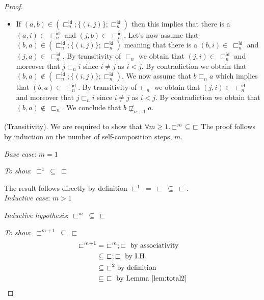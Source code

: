 \begin{thm}
\begin{proof}
{\begin{itemize}
		\item If $(a, b) \in \left( \sqsubset_n^\mathsf{id} ; \{ (i, j) \} ; \sqsubset_n ^\mathsf{id} \right)$ then this implies that there is a $(a, i) \in\ \sqsubset_n^\mathsf{id}$ and $(j, b) \in\ \sqsubset_n^\mathsf{id}$. Let's now assume that $(b, a) \in \left( \sqsubset_n^\mathsf{id} ; \{ (i, j) \} ; \sqsubset_n ^\mathsf{id} \right)$ meaning that there is a $(b, i) \in\ \sqsubset_n^\mathsf{id}$ and $(j, a) \in\ \sqsubset_n^\mathsf{id}$. By transitivity of $\sqsubset_n$ we obtain that $(j, i) \in\ \sqsubset_n^\mathsf{id}$ and moreover that $j \sqsubset_n i$ since $i \neq j$ as $i < j$. By contradiction we obtain that $(b, a) \not\in \left( \sqsubset_n^\mathsf{id} ; \{ (i, j) \} ; \sqsubset_n ^\mathsf{id} \right)$. We now assume that $b \sqsubset_n a$ which implies that $(b, a) \in\ \sqsubset_n^\mathsf{id}$. By transitivity of $\sqsubset_n$ we obtain that $(j, i) \in\ \sqsubset_n^\mathsf{id}$ and moreover that $j \sqsubset_n i$ since $i \neq j$ as $i < j$. By contradiction we obtain that $(b, a) \not\in\ \sqsubset_n$. We conclude that $b \not\sqsubset_{n + 1} a$.
	\end{itemize}
	}
	
	(Transitivity). We are required to show that $\forall m \geq 1 \ldotp \sqsubset^m\ \subseteq\ \sqsubset$ The proof follows by induction on the number of self-composition steps, $m$.
	
	{\parindent0pt
	\textit{Base case}: $m = 1$
	
	\textit{To show}: $\sqsubset^1\ \subseteq\ \sqsubset$
	
	The result follows directly by definition $\sqsubset^1\ =\ \sqsubset\ \subseteq\ \sqsubset$. \\
	
	\textit{Inductive case}: $m > 1$
	
	\textit{Inductive hypothesis}: $\sqsubset^m\ \subseteq\ \sqsubset$
	
	\textit{To show}: $\sqsubset^{m + 1}\ \subseteq\ \sqsubset$
	\begin{align*}
		\sqsubset^{m + 1}
		&=\ \sqsubset^m ; \sqsubset \text{ by associativity} \\
		&\subseteq\ \sqsubset ; \sqsubset \text{ by I.H.} \\
		&\subseteq\ \sqsubset^2 \text{by definition} \\
		&\subseteq\ \sqsubset \text{ by Lemma \ref{lem:total2}}
	\end{align*}
	}
	

\end{proof}
\end{thm}
